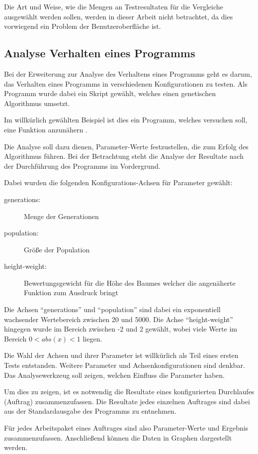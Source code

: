 Die Art und Weise, wie die Mengen an Testresultaten für die Vergleiche ausgewählt werden sollen, werden in dieser Arbeit nicht betrachtet,
da dies vorwiegend ein Problem der Benutzeroberfläche ist.

\subsection{Analyse Verhalten eines Programms}

Bei der Erweiterung zur Analyse des Verhaltens eines Programms
geht es darum, das Verhalten eines Programms
in verschiedenen Konfigurationen zu testen.
Als Programm wurde dabei ein Skript gewählt,
welches einen genetischen Algorithmus umsetzt.

Im willkürlich gewählten Beispiel ist dies ein Programm,
welches versuchen soll, eine Funktion anzunähern \cite{gen:prog}.

Die Analyse soll dazu dienen, Parameter-Werte festzustellen,
die zum Erfolg des Algorithmus führen.
Bei der Betrachtung steht die Analyse der Resultate nach der Durchführung des Programms im Vordergrund.

Dabei wurden die folgenden Konfigurations-Achsen für Parameter gewählt:

\begin{description}
    \item[generations:] Menge der Generationen
    \item[population:] Größe der Population
    \item[height-weight:] Bewertungsgewicht für die Höhe des Baumes welcher die angenäherte Funktion zum Ausdruck bringt
\end{description}

Die Achsen ``generations'' und ``population'' sind dabei ein exponentiell wachsender Wertebereich zwischen 20 und 5000.
Die Achse ``height-weight'' hingegen wurde im Bereich zwischen -2 und 2 gewählt,
wobei viele Werte im Bereich $ 0<abs(x)<1$ liegen.

Die Wahl der Achsen und ihrer Parameter ist willkürlich als Teil eines ersten Tests entstanden.
Weitere Parameter und Achsenkonfigurationen sind denkbar.
Das Analysewerkzeug soll zeigen, welchen Einfluss die Parameter haben.

Um dies zu zeigen, ist es notwendig die Resultate
eines konfigurierten Durchlaufes (Auftrag) zusammenzufassen.
Die Resultate jedes einzelnen Auftrages sind dabei aus der Standardausgabe
des Programms zu entnehmen.

Für jedes Arbeitspaket eines Auftrages sind also Parameter-Werte und Ergebnis zusammenzufassen.
Anschließend können die Daten in Graphen dargestellt werden.


